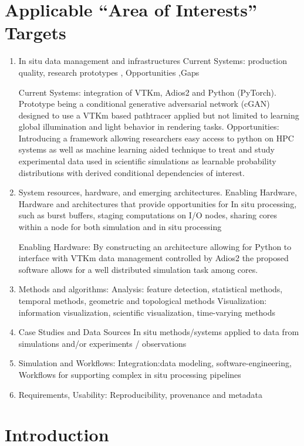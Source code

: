 \documentclass[sigconf,authordraft]{acmart}
\begin{document}
\section{Applicable ``Area of Interests'' Targets}
\begin{enumerate}
    \item In situ data management and infrastructures
Current Systems: production quality, research prototypes , Opportunities ,Gaps

Current Systems: integration of VTKm, Adios2 and Python (PyTorch). Prototype being a conditional generative adversarial network (cGAN) designed to use a VTKm based pathtracer applied but not limited to learning global illumination and light behavior in rendering tasks. 
Opportunities: Introducing a framework allowing researchers easy access to python on HPC systems as well as machine learning aided technique to treat and study experimental data used in scientific simulations as learnable probability distributions with derived conditional dependencies of interest.

   \item System resources, hardware, and emerging architectures.
Enabling Hardware, Hardware and architectures that provide opportunities for In situ processing, such as burst buffers, staging computations on I/O nodes, sharing cores within a node for both simulation and in situ processing

Enabling Hardware: By constructing an architecture allowing for Python to interface with VTKm data management controlled by Adios2 the proposed software allows for a well distributed simulation task among cores.

  \item Methods and algorithms:
Analysis: feature detection, statistical methods, temporal methods, geometric and topological methods 
Visualization: information visualization, scientific visualization, time-varying methods
  \item Case Studies and Data Sources
In situ methods/systems applied to data from simulations and/or experiments / observations
  \item Simulation and Workflows:
Integration:data modeling, software-engineering, 
Workflows for supporting complex in situ processing pipelines
  \item Requirements, Usability:
Reproducibility, provenance and metadata

\end{enumerate}

\section{Introduction}
\end{document}
